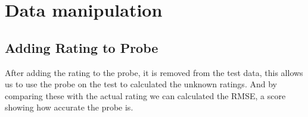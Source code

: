\section{Data manipulation}
\subsection{Adding Rating to Probe}
After adding the rating to the probe, it is removed from the test data, this allows us to use the probe on the test to calculated the unknown ratings. And by comparing these with the actual rating we can calculated the RMSE, a score showing how accurate the probe is. 